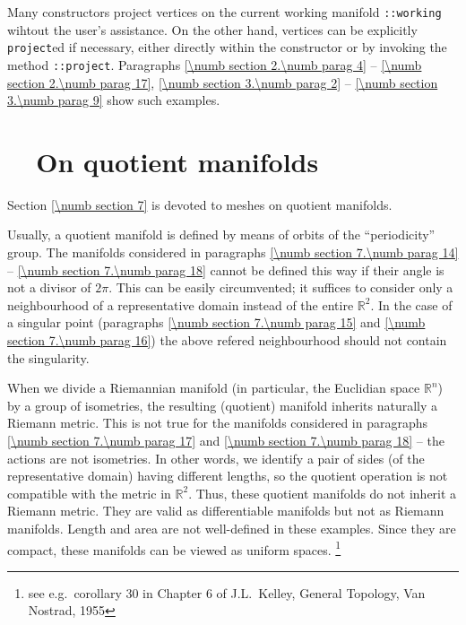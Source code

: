 Many {\small\tt{}} constructors project vertices on the current working manifold
{\small\tt{}::working} wihtout the user's assistance.
On the other hand, vertices can be explicitly {\small\tt project}ed if necessary,
either directly within the {\small\tt{}} constructor or by invoking the method
{\small\tt{}::project}.
Paragraphs \ref{\numb section 2.\numb parag 4} -- \ref{\numb section 2.\numb parag 17},
\ref{\numb section 3.\numb parag 2} -- \ref{\numb section 3.\numb parag 9} show such examples.


\section{~~On quotient manifolds}\label{\numb section 8.\numb parag 2}

Section \ref{\numb section 7} is devoted to meshes on quotient manifolds.

Usually, a quotient manifold is defined by means of orbits of the ``periodicity'' group.
The manifolds considered in paragraphs \ref{\numb section 7.\numb parag 14} --
\ref{\numb section 7.\numb parag 18} cannot be defined this way if their angle is not a
divisor of $ 2\pi $.
This can be easily circumvented; it suffices to consider only a neighbourhood of a representative
domain instead of the entire $ \mathbb{R}^2 $.
In the case of a singular point (paragraphs \ref{\numb section 7.\numb parag 15} and
\ref{\numb section 7.\numb parag 16}) the above refered neighbourhood should not contain
the singularity.

When we divide a Riemannian manifold (in particular, the Euclidian space $ \mathbb{R}^n $)
by a group of isometries, the resulting (quotient) manifold inherits naturally a Riemann metric.
This is not true for the manifolds considered in paragraphs \ref{\numb section 7.\numb parag 17}
and \ref{\numb section 7.\numb parag 18} -- the actions are not isometries.
In other words, we identify a pair of sides (of the representative domain) having different lengths,
so the quotient operation is not compatible with the metric in $ \mathbb{R}^2 $.
Thus, these quotient manifolds do not inherit a Riemann metric.
They are valid as differentiable manifolds but not as Riemann manifolds.
Length and area are not well-defined in these examples.
Since they are compact, these manifolds can be viewed as uniform spaces.%
\footnote {{} see e.g.\ corollary 30 in Chapter 6 of J.L.~Kelley, General Topology, Van Nostrad, 1955}


